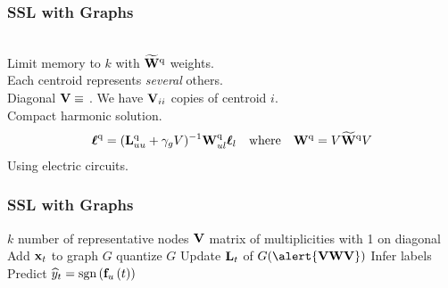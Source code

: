 \documentclass{beamer}
\begin{document}
\renewcommand{\hfs}{\bell^\star}
\newcommand{\hfsoq}{\bell^{\rm q}}
\newcommand{\hfso}{\bell^{\rm o}}
\newcommand{\W}{\bW}
\newcommand{\Woq}{\bW^{\rm q}}
\newcommand{\compactWoq}{\widetilde{\bW}^{\rm q}}
\newcommand{\compactW}{\widetilde{\bW}}
\newcommand{\Wo}{\bW^{\rm o}}
\newcommand{\Lo}{\bL^{\rm o}}
\newcommand{\Loq}{\bL^{\rm q}}
\newcommand{\Do}{\bD^{\rm o}}
\newcommand{\Doq}{\bD^{\rm q}}
\newcommand{\Ko}{\bQ^{\rm o}}
\newcommand{\Koq}{\bQ^{\rm q}}
\newcommand{\Zo}{\bZ^{\rm o}}
\newcommand{\Zoq}{\bZ^{\rm q}}
\newcommand{\co}{c^{\rm o}}
\newcommand{\coq}{c^{\rm q}}
\newcommand{\ello}{\bell^{\rm o}}
\newcommand{\elloq}{\bell^{\rm q}}
\newcommand{\Rmultiplier}{m}

\begin{frame}
\frametitle{ SSL with Graphs}
\\[0.5em]
\pause
Limit memory to $k$  with $\compactWoq$ weights. \\[0.5em]
\pause
Each centroid represents \textit{several} others. \\[0.5em]
\pause
Diagonal $\mathbf{V} \equiv$  . 
\pause 
We have $\mathbf{V}_{ii}$ copies of centroid $i$.
\\[0.5em]
\pause
{}
\pause Compact harmonic solution.
\begin{align*}
  \hfsoq =
  (\Loq_{uu} + \gamma_g V)^{-1} \Woq_{ul} \bell_l
\quad\mbox{where}\quad\Woq = V \compactWoq V
\end{align*}
\pause
{} \pause Using electric circuits.\\[0.5em]
\pause
{}

\end{frame}
\begin{frame}
\frametitle{ SSL with Graphs}
\begin{algorithm}[H]
\begin{algorithmic}[1]
\STATE \quad \alert{$k$} number of representative nodes \pause
{}
\STATE \quad \alert{$\mathbf{V}$} matrix of multiplicities with 1 on diagonal \pause
{}
\STATE Add $\mathbf{x}_t$ to graph $G$  
 \STATE  \alert{quantize $G$} \ENDIF
\STATE \pause Update $\mathbf{L}_t$ of $G(\alert{\bV\bW\bV})$
\STATE \pause Infer labels 
\STATE Predict $\widehat y_t =  \operatorname*{sgn}\left(\mathbf{f}_u\left(t\right)\right)$
\ENDWHILE
\end{algorithmic}
\caption*{Online HFS with Graph Quantization}
\end{algorithm}
\end{frame}



\MakeLastSlide
\end{document}
